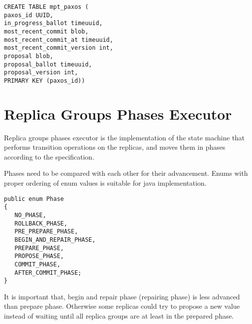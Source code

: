 \begin{lstlisting}[style=outcode,label={lst:paxosStateImpl},caption={Table definition for multi partition transactions paxos state}]
CREATE TABLE mpt_paxos (
paxos_id UUID,
in_progress_ballot timeuuid,
most_recent_commit blob,
most_recent_commit_at timeuuid,
most_recent_commit_version int,
proposal blob,
proposal_ballot timeuuid,
proposal_version int,
PRIMARY KEY (paxos_id))
\end{lstlisting}


\section{Replica Groups Phases Executor}
Replica groups phases executor is the implementation of the state machine that performs transition operations on the replicas, and moves them in phases according to the specification.

Phases need to be compared with each other for their advancement. Enums with proper ordering of enum values is suitable for java implementation.

\begin{lstlisting}[style=outcode,label={lst:phaseEnum},caption={Phase enum}]
public enum Phase
{
   NO_PHASE,
   ROLLBACK_PHASE,
   PRE_PREPARE_PHASE,
   BEGIN_AND_REPAIR_PHASE,
   PREPARE_PHASE,
   PROPOSE_PHASE,
   COMMIT_PHASE,
   AFTER_COMMIT_PHASE;
}
\end{lstlisting}

It is important that, begin and repair phase (repairing phase) is less advanced than prepare phase. Otherwise some replicas could try to propose a new value instead of waiting until all replica groups are at least in the prepared phase.

